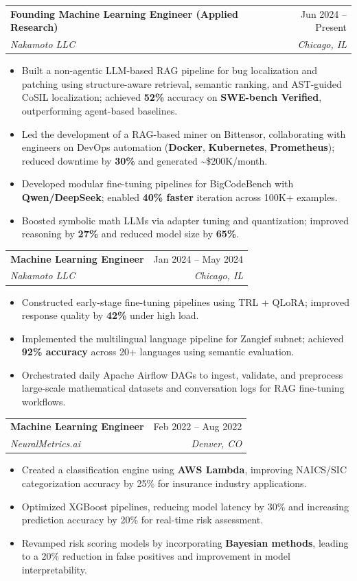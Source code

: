 \documentclass[letterpaper,10pt]{article}
\makeatletter
\newcommand{\resumeItem}[1]{
  \item\small{
    {#1 \vspace{-3pt}}
  }
}
\newcommand{\resumeSubheading}[4]{
  \vspace{-2pt}\item
    \begin{tabular*}{0.97\textwidth}[t]{l@{\extracolsep{\fill}}r}
      \textbf{#1} & #2 \\
      \textit{\small#3} & \textit{\small #4} \\
    \end{tabular*}\vspace{-3pt}
}
\newcommand{\resumeItemListEnd}{\end{itemize}\vspace{-3pt}}
\newcommand{\resumeItemListStart}{\begin{itemize}[topsep=1pt, itemsep=1pt]}
\makeatother
\begin{document}
\resumeSubheading
  {Founding Machine Learning Engineer (Applied Research)}{Jun 2024 -- Present}
  {Nakamoto LLC}{Chicago, IL}
  \resumeItemListStart
\resumeItem{Built a non-agentic LLM-based RAG pipeline for bug localization and patching using structure-aware retrieval, semantic ranking, and AST-guided CoSIL localization; achieved \textbf{52\%} accuracy on \textbf{SWE-bench Verified}, outperforming agent-based baselines.}
\resumeItem{Led the development of a RAG-based miner on Bittensor, collaborating with engineers on DevOps automation (\textbf{Docker}, \textbf{Kubernetes}, \textbf{Prometheus}); reduced downtime by \textbf{30\%} and generated \textasciitilde\$200K/month.}
\resumeItem{Developed modular fine-tuning pipelines for BigCodeBench with \textbf{Qwen/DeepSeek}; enabled \textbf{40\% faster} iteration across 100K+ examples.}
\resumeItem{Boosted symbolic math LLMs via adapter tuning and quantization; improved reasoning by \textbf{27\%} and reduced model size by \textbf{65\%}.}

\resumeItemListEnd

  \vspace{4pt}


\resumeSubheading
  {Machine Learning Engineer}{Jan 2024 -- May 2024}
  {Nakamoto LLC}{Chicago, IL}
  \resumeItemListStart
    \resumeItem{Constructed early-stage fine-tuning pipelines using TRL + QLoRA; improved response quality by \textbf{42\%} under high load.}
    \resumeItem{Implemented the multilingual language pipeline for Zangief subnet; achieved \textbf{92\% accuracy} across 20+ languages using semantic evaluation.}
    \resumeItem{Orchestrated daily Apache Airflow DAGs to ingest, validate, and preprocess large-scale mathematical datasets and conversation logs for RAG fine-tuning workflows.}
    
  \resumeItemListEnd\vspace{4pt}





  \resumeSubheading
    {Machine Learning Engineer}{Feb 2022 -- Aug 2022}
    {NeuralMetrics.ai}{Denver, CO}
    \resumeItemListStart
      \resumeItem{Created a classification engine using \textbf{AWS Lambda}, improving NAICS/SIC categorization accuracy by 25\% for insurance industry applications.}
      \resumeItem{Optimized XGBoost pipelines, reducing model latency by 30\% and increasing prediction accuracy by 20\% for real-time risk assessment.}
    \resumeItem{Revamped risk scoring models by incorporating \textbf{Bayesian methods}, leading to a 20\% reduction in false positives and improvement in model interpretability.}
    \resumeItemListEnd
    
\end{document}
